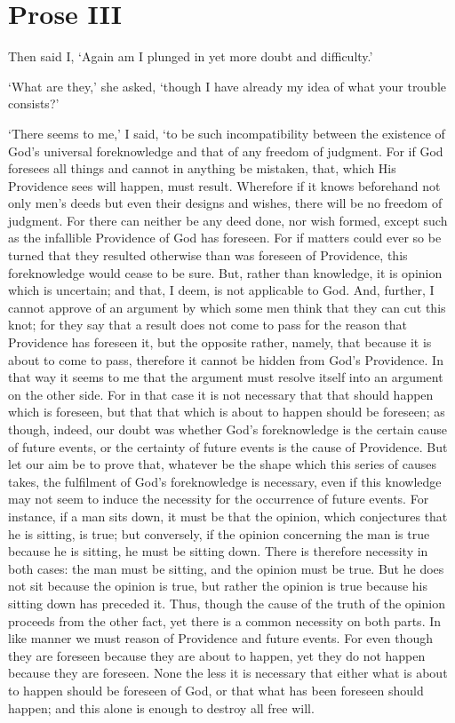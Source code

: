 \section*{Prose III}

Then said I, `Again am I plunged in yet more doubt and difficulty.'

`What are they,' she asked, `though I have already my idea of what
your trouble consists?'

`There seems to me,' I said, `to be such incompatibility between the
existence of God's universal foreknowledge and that of any freedom of
judgment. For if God foresees all things and cannot in anything be
mistaken, that, which His Providence sees will happen, must result.
Wherefore if it knows beforehand not only men's deeds but even their
designs and wishes, there will be no freedom of judgment. For there
can neither be any deed done, nor wish formed, except such as the
infallible Providence of God has foreseen. For if matters could ever
so be turned that they resulted otherwise than was foreseen of
Providence, this foreknowledge would cease to be sure. But, rather
than knowledge, it is opinion which is uncertain; and that, I deem, is
not applicable to God. And, further, I cannot approve of an argument
by which some men think that they can cut this knot; for they say that
a result does not come  to pass for the reason that
Providence has foreseen it, but the opposite rather, namely, that
because it is about to come to pass, therefore it cannot be hidden
from God's Providence. In that way it seems to me that the argument
must resolve itself into an argument on the other side. For in that
case it is not necessary that that should happen which is foreseen,
but that that which is about to happen should be foreseen; as though,
indeed, our doubt was whether God's foreknowledge is the certain
cause of future events, or the certainty of future events is the cause
of Providence. But let our aim be to prove that, whatever be the shape
which this series of causes takes, the fulfilment of God's
foreknowledge is necessary, even if this knowledge may not seem to
induce the necessity for the occurrence of future events. For
instance, if a man sits down, it must be that the opinion, which
conjectures that he is sitting, is true; but conversely, if the
opinion concerning the man is true because he is sitting, he must be
sitting down. There is therefore necessity in both cases: the man must
be sitting, and the opinion must be true. But he does not sit
because the opinion is true, but rather the opinion is true because
his sitting down has preceded it. Thus, though the cause of the truth
of the opinion proceeds from the other fact, yet there is a common
necessity on both parts. In like manner we must reason of Providence
and future events. For even though they are foreseen because they are
about  to happen, yet they do not happen because they are
foreseen. None the less it is necessary that either what is about to
happen should be foreseen of God, or that what has been foreseen
should happen; and this alone is enough to destroy all free will.

